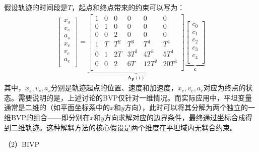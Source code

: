 \documentclass[master,academic]{ysuthesis} %
\begin{document}
		假设轨迹的时间段是$T$，起点和终点带来的约束可以写为：
		\begin{equation}
			\begin{aligned}
				\left[ \begin{array}{c}
				x_s\\
				v_s\\
				a_s\\
				x_e\\
				v_e\\
				a_e\\
				\end{array} \right] 
				=\underbrace{\begin{bmatrix}
					1&		0&		0&		0&		0&		0\\
					0&		1&		0&		0&		0&		0\\
					0&		0&		2&		0&		0&		0\\
					1&		T&		T^2&		T^3&		T^4&		T^4\\
					0&		1&		2T&		3T^2&		4T^3&		5T^4\\
					0&		0&		2&		6T&		12T^2&		20T^3\\
					\end{bmatrix}}_{\bm{A_F}(t)}  
				\underbrace{\begin{bmatrix}
				c_0\\
				c_1\\
				c_2\\
				c_3\\
				c_4\\
				\end{bmatrix}}_{\bm{c}} 
			\end{aligned}
			\label{eq:BVP}
		\end{equation}
		其中，$x_s,v_s,a_s$分别是轨迹起点的位置、速度和加速度，$x_e,v_e,a_e$对应为终点的状态。需要说明的是，上述讨论的BVP仅针对一维情况。而实际应用中，平坦变量通常是二维的（如平面坐标系中的$x$和$y$方向），此时可以将其分解为两个独立的一维BVP的组合——即分别在$x$和$y$方向求解对应的边界条件，最终通过坐标合成得到二维轨迹。这种解耦方法的核心假设是两个维度在平坦域内无耦合约束。
		
		（2）BIVP 
		
\end{document}
